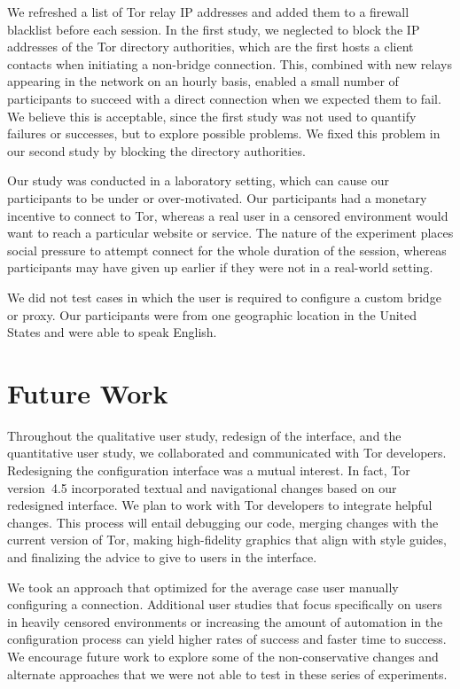 \documentclass[USenglish,oneside,twocolumn]{article}
\begin{document}
We refreshed a list of Tor relay IP addresses and added them
to a firewall blacklist before each session.
In the first study, we neglected to block the IP addresses
of the Tor directory authorities, which are the first hosts
a client contacts when initiating a non-bridge connection.
This, combined with new relays appearing in the network on an hourly basis,
enabled a small number of participants to succeed with
a direct connection when we expected them to fail.
We believe this is acceptable, since 
the first study was not used to quantify failures or successes, 
but to explore possible problems.
We fixed this problem in our second study by blocking the directory authorities.

Our study was conducted in a laboratory setting, which can cause our participants to be under or over-motivated. Our participants had a monetary incentive to connect to Tor, whereas a real user in a censored environment would want to reach a particular website or service. The nature of the experiment places social pressure to attempt connect for the whole duration of the session, whereas participants may have given up earlier if they were not in a real-world setting.   

We did not test cases in which the user is required to configure a custom bridge or proxy. Our participants were from one geographic location in the United States and were able to speak English.

\section{Future Work} 
Throughout the qualitative user study, redesign of the interface, and the quantitative user study, we collaborated and communicated with Tor developers. Redesigning the configuration interface was a mutual interest. In fact, Tor version~4.5 incorporated textual and navigational changes based on our redesigned interface. We plan to work with Tor developers to integrate helpful changes. This process will entail debugging our code, merging changes with the current version of Tor, making high-fidelity graphics that align with style guides, and finalizing the advice to give to users in the interface. 

We took an approach that optimized for the average case user manually configuring a connection. Additional user studies that focus specifically on users in heavily censored environments or increasing the amount of automation in the configuration process can yield higher rates of success and faster time to success. We encourage future work to explore some of the non-conservative changes and alternate approaches that we were not able to test in these series of experiments.\\
\end{document}
